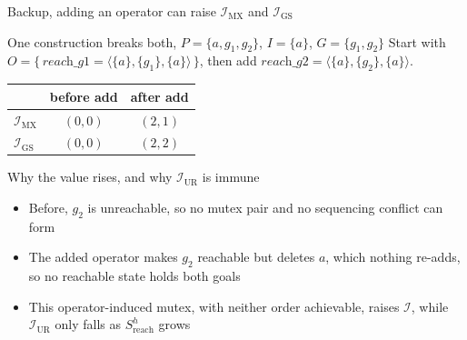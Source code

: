 \begin{frame}[noframenumbering]{Backup, adding an operator can raise $\mathcal{I}_{\text{MX}}$ and $\mathcal{I}_{\text{GS}}$}
    \hypertarget{bk:op-mono-ce}{}
    \begin{exampleblock}{One construction breaks both, $P = \{a, g_1, g_2\}$, $I = \{a\}$, $G = \{g_1, g_2\}$}
        \footnotesize
        Start with $O = \{\,\textit{reach\_g1} = \langle \{a\}, \{g_1\}, \{a\}\rangle\,\}$, then add $\textit{reach\_g2} = \langle \{a\}, \{g_2\}, \{a\}\rangle$.\\[2pt]
        \centering
        \begin{tabular}{lcc}
            \toprule
                                      & before add & after add \\
            \midrule
            $\mathcal{I}_{\text{MX}}$ & $(0, 0)$   & $(2, 1)$  \\
            $\mathcal{I}_{\text{GS}}$ & $(0, 0)$   & $(2, 2)$  \\
            \bottomrule
        \end{tabular}
    \end{exampleblock}

    \begin{block}{Why the value rises, and why $\mathcal{I}_{\text{UR}}$ is immune}
        \footnotesize
        \begin{itemize}
            \item Before, $g_2$ is unreachable, so no mutex pair and no sequencing conflict can form
            \item The added operator makes $g_2$ reachable but deletes $a$, which nothing re-adds, so no reachable state holds both goals
            \item This operator-induced mutex, with neither order achievable, raises $\mathcal{I}$, while $\mathcal{I}_{\text{UR}}$ only falls as $S^h_{\text{reach}}$ grows
        \end{itemize}
    \end{block}

\end{frame}

